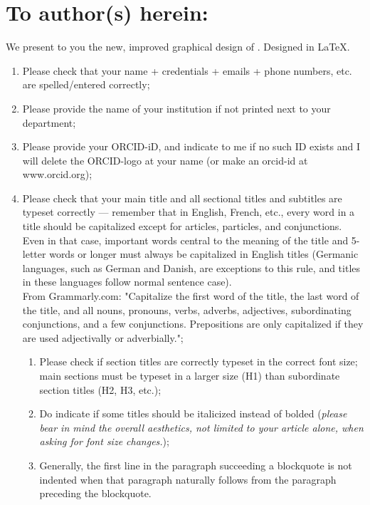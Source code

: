 \chapter{\Huge To author(s) herein:}
    \thispagestyle{empty}

We present to you the new, improved graphical design of \theJournal. Designed in \LaTeX.

\begin{enumerate}
        \item Please check that your name + credentials + emails + phone numbers, etc. are spelled/entered correctly;
    \item Please provide the name of your institution if not printed next to your department;
    \item Please provide your ORCID-iD, and indicate to me if no such ID exists and I will delete the ORCID-logo at your name (or make an orcid-id at www.orcid.org);
    \item Please check that your main title and all sectional titles and subtitles are typeset correctly --- remember that in English, French, etc., every word in a title should be capitalized except for articles, particles, and conjunctions. Even in that case, important words central to the meaning of the title and 5-letter words or longer must always be capitalized in English titles (Germanic languages, such as German and Danish, are exceptions to this rule, and titles in these languages follow normal sentence case).
    \\From Grammarly.com: "Capitalize the first word of the title, the last word of the title, and all nouns, pronouns, verbs, adverbs, adjectives, subordinating conjunctions, and a few conjunctions. Prepositions are only capitalized if they are used adjectivally or adverbially.";
        \begin{enumerate}
        \item Please check if section titles are correctly typeset in the correct font size; main sections must be typeset in a larger size (H1) than subordinate section titles (H2, H3, etc.);
        \item Do indicate if some titles should be italicized instead of bolded (\textit{please bear in mind the overall aesthetics, not limited to your article alone, when asking for font size changes.});
        \item Generally, the first line in the paragraph succeeding a blockquote is not indented when that paragraph naturally follows from the paragraph preceding the blockquote.

\end{enumerate}
\end{enumerate}
